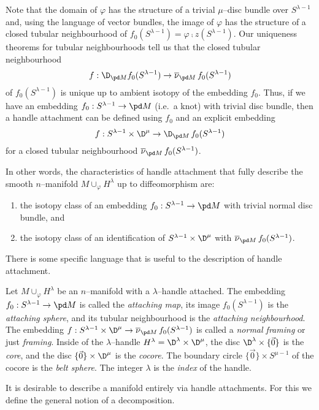 Note that the domain of $\varphi$ has the structure of a trivial $\mu$--disc bundle over $S^{\lambda-1}$ and, using the language of vector bundles, the image of $\varphi$ has the structure of a closed tubular neighbourhood of $f_0(S^{\lambda-1})=\varphi\comp z(S^{\lambda-1})$.
Our uniqueness theorems for tubular neighbourhoods tell us that the closed tubular neighbourhood
\[
	f:\D_{\pd M}f_0(S^{\lambda-1})\to\overline{\nu}_{\pd M}\,f_0(S^{\lambda-1})
\]
of $f_0(S^{\lambda-1})$ is unique up to ambient isotopy of the embedding $f_0$.
Thus, if we have an embedding $f_0:S^{\lambda-1}\to \pd M$ (i.e.\ a knot) with trivial disc bundle, then a handle attachment can be defined using $f_0$ and an explicit embedding 
\[
	f: S^{\lambda-1}\times\D^\mu\to \D_{\pd M}\,f_0(S^{\lambda-1})
\]
for a closed tubular neighbourhood $\overline{\nu}_{\pd M}\,f_0(S^{\lambda-1})$.

In other words, the characteristics of handle attachment that fully describe the smooth $n$--manifold $M\cup_\varphi H^\lambda$ up to diffeomorphism are:
\begin{enumerate}
	\item the isotopy class of an embedding $f_0:S^{\lambda-1}\to\pd M$ with trivial normal disc bundle, and 
	\item the isotopy class of an identification of $S^{\lambda-1}\times\D^\mu$ with $\overline{\nu}_{\pd M}\,f_0(S^{\lambda-1})$.
\end{enumerate}

There is some specific language that is useful to the description of handle attachment.

\begin{defn}
	Let $M\cup_\varphi H^\lambda$ be an $n$--manifold with a $\lambda$--handle attached.
	The embedding $f_0:S^{\lambda-1}\to\pd M$ is called the \emph{attaching map}, its image $f_0(S^{\lambda-1})$ is the \emph{attaching sphere}, and its tubular neighbourhood is the \emph{attaching neighbourhood}.
	The embedding $f: S^{\lambda-1}\times \D^\mu\to \overline{\nu}_{\pd M}\,f_0(S^{\lambda-1})$ is called a \emph{normal framing} or just \emph{framing}.
	Inside of the $\lambda$--handle $H^\lambda=\D^\lambda\times\D^\mu$, the disc $\D^\lambda\times\{\vec{0}\}$ is the \emph{core}, and the disc $\{\vec{0}\}\times\D^\mu$ is the \emph{cocore}.
	The boundary circle $\{\vec{0}\}\times S^{\mu-1}$ of the cocore is the \emph{belt sphere}.
	The integer $\lambda$ is the \emph{index} of the handle.
\end{defn}

It is desirable to describe a manifold entirely via handle attachments.
For this we define the general notion of a decomposition.

